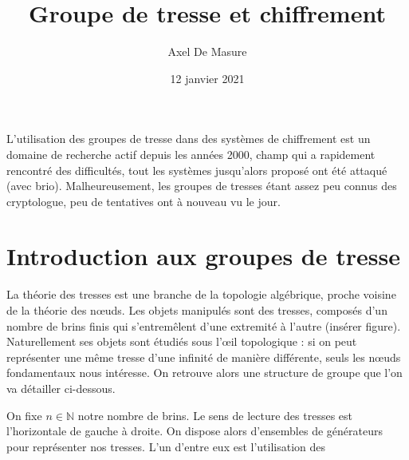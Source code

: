 \documentclass[a4paper, 100pt]{article}
\begin{document}
\title{\textbf{Groupe de tresse et chiffrement}}
\author{Axel De Masure}
\date{12 janvier 2021}
\maketitle


L'utilisation des groupes de tresse dans des systèmes de chiffrement est un domaine de recherche actif depuis les années 2000, champ qui a rapidement rencontré des difficultés, tout les systèmes jusqu'alors proposé ont été attaqué (avec brio). Malheureusement, les groupes de tresses étant assez peu connus des cryptologue, peu de tentatives ont à nouveau vu le jour.
\section{Introduction aux groupes de tresse}
La théorie des tresses est une branche de la topologie algébrique, proche voisine de la théorie des nœuds. Les objets manipulés sont des tresses, composés d'un nombre de brins finis qui s'entremêlent d'une extremité à l'autre (insérer figure).
Naturellement ses objets sont étudiés sous l'œil topologique : si on peut représenter une même tresse d'une infinité de manière différente, seuls les nœuds fondamentaux nous intéresse.
On retrouve alors une structure de groupe que l'on va détailler ci-dessous.


On fixe $ n \in \mathbb{N} $ notre nombre de brins. Le sens de lecture des tresses est l'horizontale de gauche à droite.
   On dispose alors d'ensembles de générateurs pour représenter nos tresses. L'un d'entre eux est l'utilisation des
\end{document}
